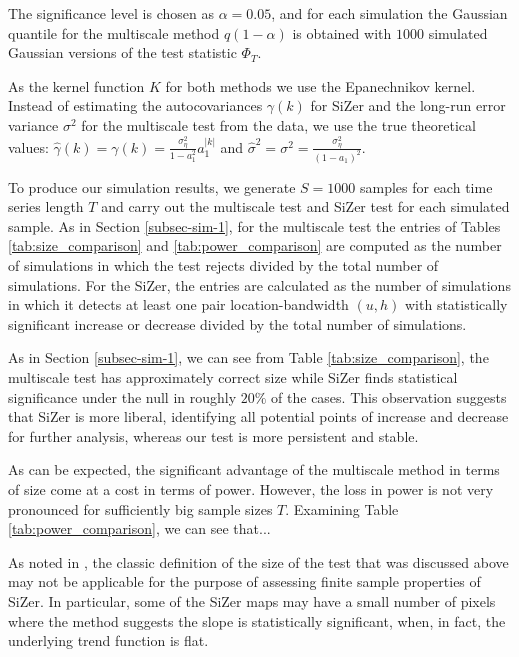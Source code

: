 \documentclass[a4paper,12pt]{article}
\begin{document}
The significance level is chosen as $\alpha = 0.05$, and for each simulation the Gaussian quantile for the multiscale method  $q(1 - \alpha)$ is obtained with $1000$ simulated Gaussian versions of the test statistic $\Phi_T$. 

As the kernel function $K$ for both methods  we use the Epanechnikov kernel. Instead of estimating the autocovariances $\gamma(k)$ for SiZer and the long-run error variance $\sigma^2$ for the multiscale test from the data, we use the true theoretical values: $\widehat{\gamma}(k) = \gamma(k) = \frac{\sigma_\eta^2}{1 - a_1^2}a_1^{|k|}$ and $\widehat{\sigma}^2 = \sigma^2 = \frac{\sigma_\eta^2}{(1 - a_1)^2}$.

To produce our simulation results, we generate $S=1000$ samples for each time series length $T$ and carry out the multiscale test and SiZer test for each simulated sample. As in Section \ref{subsec-sim-1}, for the multiscale test the entries of Tables \ref{tab:size_comparison} and \ref{tab:power_comparison} are computed as the number of simulations in which the test rejects divided by the total number of simulations. For the SiZer, the entries are calculated as the number of simulations in which it detects at least one pair location-bandwidth $(u,h)$ with statistically significant increase or decrease divided by the total number of simulations.

As in Section \ref{subsec-sim-1}, we can see from Table \ref{tab:size_comparison}, the multiscale test has approximately correct size while SiZer finds statistical significance under the null in roughly $20\%$ of the cases. This observation suggests that SiZer is more liberal, identifying all potential points of increase and decrease for further analysis, whereas our test is more persistent and stable.

As can be expected, the significant advantage of the multiscale method in terms of size come at a cost in terms of power. However, the loss in power is not very pronounced for sufficiently big sample sizes $T$. Examining Table \ref{tab:power_comparison}, we can see that...


As noted in \cite{HannigMarron2006}, the classic definition of the size of the test that was discussed above may not be applicable for the purpose of assessing finite sample properties of SiZer. In particular, some of the SiZer maps may have a small number of pixels where the method suggests the slope is statistically significant, when, in fact, the underlying trend function is flat.
\end{document}
